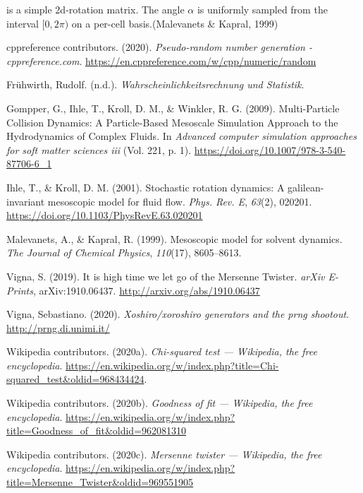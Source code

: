 \documentclass[
]{article}
\newlength{\cslhangindent}
\newenvironment{cslreferences}%
  {\setlength{\parindent}{0pt}%
  \everypar{\setlength{\hangindent}{\cslhangindent}}\ignorespaces}%
  {\par}
\begin{document}
is a simple 2d-rotation matrix. The angle \(\alpha\) is uniformly
sampled from the interval \([0, 2\pi)\) on a per-cell basis.(Malevanets
\& Kapral, 1999)

\hypertarget{refs}{}
\begin{cslreferences}
\leavevmode\hypertarget{ref-cppreference:prng}{}%
cppreference contributors. (2020). \emph{Pseudo-random number generation
- cppreference.com}.
\url{https://en.cppreference.com/w/cpp/numeric/random}

\leavevmode\hypertarget{ref-fruehwirthstat}{}%
Frühwirth, Rudolf. (n.d.). \emph{Wahrscheinlichkeitsrechnung und
Statistik}.

\leavevmode\hypertarget{ref-winkl2009}{}%
Gompper, G., Ihle, T., Kroll, D. M., \& Winkler, R. G. (2009).
Multi-Particle Collision Dynamics: A Particle-Based Mesoscale Simulation
Approach to the Hydrodynamics of Complex Fluids. In \emph{Advanced
computer simulation approaches for soft matter sciences iii} (Vol. 221,
p. 1). \url{https://doi.org/10.1007/978-3-540-87706-6_1}

\leavevmode\hypertarget{ref-ihlekroll2001}{}%
Ihle, T., \& Kroll, D. M. (2001). Stochastic rotation dynamics: A
galilean-invariant mesoscopic model for fluid flow. \emph{Phys. Rev. E},
\emph{63}(2), 020201. \url{https://doi.org/10.1103/PhysRevE.63.020201}

\leavevmode\hypertarget{ref-malev1999}{}%
Malevanets, A., \& Kapral, R. (1999). Mesoscopic model for solvent
dynamics. \emph{The Journal of Chemical Physics}, \emph{110}(17),
8605--8613.

\leavevmode\hypertarget{ref-vigna2019}{}%
Vigna, S. (2019). It is high time we let go of the Mersenne Twister.
\emph{arXiv E-Prints}, arXiv:1910.06437.
\url{http://arxiv.org/abs/1910.06437}

\leavevmode\hypertarget{ref-unimi:xoshiro}{}%
Vigna, Sebastiano. (2020). \emph{Xoshiro/xoroshiro generators and the
prng shootout}. \url{http://prng.di.unimi.it/}

\leavevmode\hypertarget{ref-wiki:chisquaredtest}{}%
Wikipedia contributors. (2020a). \emph{Chi-squared test --- Wikipedia,
the free encyclopedia}.
\url{https://en.wikipedia.org/w/index.php?title=Chi-squared_test\&oldid=968434424}.

\leavevmode\hypertarget{ref-wiki:goodnessoffit}{}%
Wikipedia contributors. (2020b). \emph{Goodness of fit --- Wikipedia,
the free encyclopedia}.
\url{https://en.wikipedia.org/w/index.php?title=Goodness_of_fit\&oldid=962081310}

\leavevmode\hypertarget{ref-wiki:mersennetwister}{}%
Wikipedia contributors. (2020c). \emph{Mersenne twister --- Wikipedia,
the free encyclopedia}.
\url{https://en.wikipedia.org/w/index.php?title=Mersenne_Twister\&oldid=969551905}


\end{cslreferences}
\end{document}
